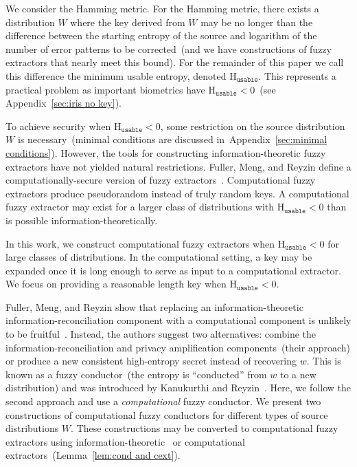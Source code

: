 \documentclass[11pt]{article}
\newcommand{\apref}[1]{\mbox{Appendix~\ref{#1}}}
\newcommand{\lemref}[1]{\mbox{Lemma~\ref{#1}}}
\newcommand{\Hoo}{\mathrm{H}_\infty}
\newcommand{\Huse}{\mathrm{H}_{\mathtt{usable}}}
\begin{document}
We consider the Hamming metric.  For the Hamming metric, there exists a distribution $W$ where the key derived from $W$ may be no longer than the difference between the starting entropy of the source and logarithm of the number of error patterns to be corrected~(and we have constructions of fuzzy extractors that nearly meet this bound). For the remainder of this paper we call this difference the minimum usable entropy, denoted $\Huse$.  This represents a practical problem as important biometrics have $\Huse<0$~(see \apref{sec:iris no key}).


To achieve security when $\Huse<0$, some restriction on the source distribution $W$ is necessary~(minimal conditions are discussed in~\apref{sec:minimal conditions}).  However, the tools for constructing information-theoretic fuzzy extractors have not yielded natural restrictions.  Fuller, Meng, and Reyzin define a computationally-secure version of fuzzy extractors~\cite{fuller2013computational}.  Computational fuzzy extractors produce pseudorandom instead of truly random keys.  A computational fuzzy extractor may exist for a larger class of distributions with $\Huse<0$ than is possible information-theoretically.

In this work, we construct computational fuzzy extractors when $\Huse<0$ for large classes of distributions.
In the computational setting, a key may be expanded once it is long enough to serve as input to a computational extractor.  We focus on providing a reasonable length key when $\Huse<0$.

Fuller, Meng, and Reyzin show that replacing an information-theoretic information-reconciliation component with a computational component is unlikely to be fruitful~\cite[Corollary 3.8, Theorem 3.10]{fuller2013computational}.  Instead, the authors suggest two alternatives: combine the information-reconciliation and privacy amplification components~(their approach) or produce a new consistent high-entropy secret instead of recovering $w$.  This is known as a fuzzy conductor~(the entropy is ``conducted'' from $w$ to a new distribution) and was introduced by Kanukurthi and Reyzin~\cite{KanukurthiR09}.  Here, we follow the second approach and use a \emph{computational} fuzzy conductor.  We present two constructions of computational fuzzy conductors for different types of source distributions $W$.  These constructions may be converted to computational fuzzy extractors using information-theoretic~\cite{nisan1993randomness} or computational~\cite{krawczyk2010cryptographic} extractors~(\lemref{lem:cond and cext}).
\end{document}

